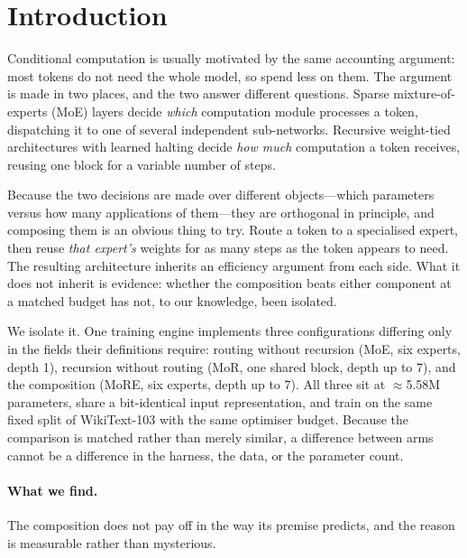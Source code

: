 \section{Introduction}
\label{sec:intro}

Conditional computation is usually motivated by the same accounting argument:
most tokens do not need the whole model, so spend less on them. The argument is
made in two places, and the two answer different questions. Sparse
mixture-of-experts (MoE) layers \citep{jacobs1991moe,shazeer2017moe,fedus2022switch}
decide \emph{which} computation module processes a token, dispatching it to one
of several independent sub-networks. Recursive weight-tied architectures with
learned halting \citep{graves2016act,dehghani2019ut,banino2021pondernet} decide
\emph{how much} computation a token receives, reusing one block for a variable
number of steps.

Because the two decisions are made over different objects---which parameters
versus how many applications of them---they are orthogonal in principle, and
composing them is an obvious thing to try. Route a token to a specialised expert,
then reuse \emph{that expert's} weights for as many steps as the token appears to
need. The resulting architecture inherits an efficiency argument from each side.
What it does not inherit is evidence: whether the composition beats either
component at a matched budget has not, to our knowledge, been isolated.

We isolate it. One training engine implements three configurations differing only
in the fields their definitions require: routing without recursion (MoE, six
experts, depth 1), recursion without routing (MoR, one shared block, depth up to
7), and the composition (MoRE, six experts, depth up to 7). All three sit at
$\approx$5.58M parameters, share a bit-identical input representation, and train
on the same fixed split of WikiText-103 \citep{merity2017wikitext} with the same
optimiser budget. Because the comparison is matched rather than merely similar, a
difference between arms cannot be a difference in the harness, the data, or the
parameter count.

\paragraph{What we find.} The composition does not pay off in the way its
premise predicts, and the reason is measurable rather than mysterious.

